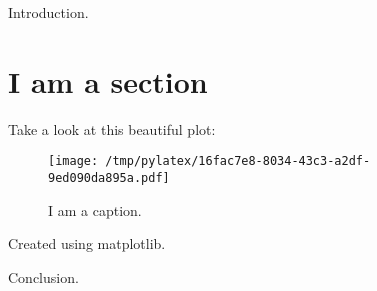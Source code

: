 \documentclass{article}%
\begin{document}
%
\normalsize%
Introduction.%
\section{I am a section}%
Take a look at this beautiful plot:%


\begin{figure}[htbp]%
\centering%
\texttt{[image: /tmp/pylatex/16fac7e8-8034-43c3-a2df-9ed090da895a.pdf]}%
\caption{I am a caption.}%
\end{figure}

%
Created using matplotlib.

%
Conclusion.%
\end{document}
